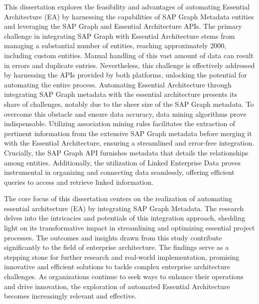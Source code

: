 \documentclass{article}
\begin{document}
This dissertation explores the feasibility and advantages of automating Essential Architecture (EA) by harnessing the capabilities of SAP Graph Metadata entities and leveraging the SAP Graph and Essential Architecture APIs. The primary challenge in integrating SAP Graph with Essential Architecture stems from managing a substantial number of entities, reaching approximately 2000, including custom entities. Manual handling of this vast amount of data can result in errors and duplicate entries. Nevertheless, this challenge is effectively addressed by harnessing the APIs provided by both platforms, unlocking the potential for automating the entire process. Automating Essential Architecture through integrating SAP Graph metadata with the essential architecture presents its share of challenges, notably due to the sheer size of the SAP Graph metadata. To overcome this obstacle and ensure data accuracy, data mining algorithms prove indispensable. Utilizing association mining rules facilitates the extraction of pertinent information from the extensive SAP Graph metadata before merging it with the Essential Architecture, ensuring a streamlined and error-free integration. Crucially, the SAP Graph API furnishes metadata that details the relationships among entities. Additionally, the utilization of Linked Enterprise Data proves instrumental in organizing and connecting data seamlessly, offering efficient queries to access and retrieve linked information.

The core focus of this dissertation centers on the realization of automating essential architecture (EA) by integrating SAP Graph Metadata. The research delves into the intricacies and potentials of this integration approach, shedding light on its transformative impact in streamlining and optimizing essential project processes. The outcomes and insights drawn from this study contribute significantly to the field of enterprise architecture. The findings serve as a stepping stone for further research and real-world implementation, promising innovative and efficient solutions to tackle complex enterprise architecture challenges. As organizations continue to seek ways to enhance their operations and drive innovation, the exploration of automated Essential Architecture becomes increasingly relevant and effective.

\newpage
\tableofcontents

\newpage
\maketitle
\end{document}
